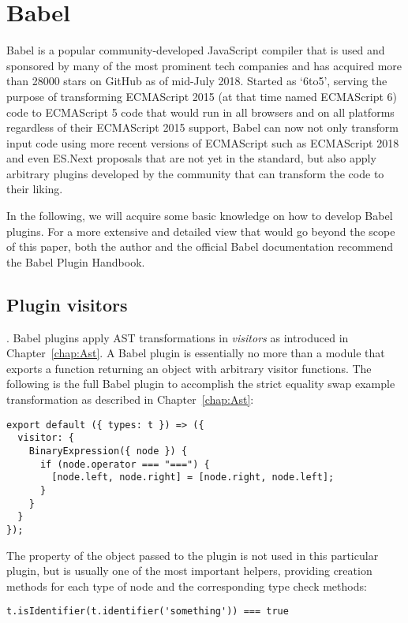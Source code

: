 \section{Babel}
Babel is a popular community-developed JavaScript compiler
that is used and sponsored by many of the most prominent tech companies
and has acquired more than 28000 stars on GitHub as of mid-July 2018.
\autocite{BabelGithub}
Started as `6to5', serving the purpose of transforming
ECMAScript 2015 (at that time named ECMAScript 6) code to
ECMAScript 5 code that would run in all browsers and on all platforms
regardless of their ECMAScript 2015 support,
Babel can now not only transform input code using
more recent versions of ECMAScript such as ECMAScript 2018
and even ES.Next proposals that are not yet in the standard,
but also apply arbitrary plugins developed by the community
that can transform the code to their liking.
\autocite{BabelPluginPrevalGithub}
\autocite{PowerAssertGithub}

In the following, we will acquire some basic knowledge on how to develop Babel plugins.
For a more extensive and detailed view that would go beyond the scope of this paper,
both the author and the official Babel documentation recommend the Babel Plugin Handbook.
\autocite{BabelPluginHandbook}

\subsection{Plugin visitors}.
Babel plugins apply AST transformations in \textit{visitors}
as introduced in Chapter~\ref{chap:Ast}.
A Babel plugin is essentially no more than a module that exports
a function returning an object with arbitrary visitor functions.
The following is the full Babel plugin to accomplish
the strict equality swap example transformation
as described in Chapter~\ref{chap:Ast}:
\begin{verbatim}
export default ({ types: t }) => ({
  visitor: {
    BinaryExpression({ node }) {
      if (node.operator === "===") {
        [node.left, node.right] = [node.right, node.left];
      }
    }
  }
});
\end{verbatim}

The  property of the object passed to the plugin
is not used in this particular plugin,
but is usually one of the most important helpers,
providing creation methods for each type of node
and the corresponding type check methods:
\begin{verbatim}
t.isIdentifier(t.identifier('something')) === true
\end{verbatim}

